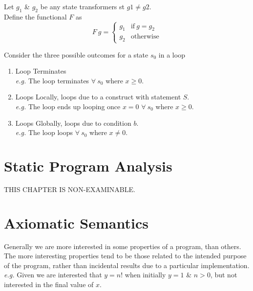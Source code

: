 \documentclass[11pt,a4paper]{article}
\begin{document}
Let $g_1$ \& $g_2$ be any state transformers st $g1\neq g2$.\\
Define the functional $F$ as
$$F\ g=\begin{cases}g_1&\mathrm{if\ }g=g_2\\g_2&\mathrm{otherwise}\end{cases}$$

Consider the three possible outcomes for a state $s_0$ in a loop
\begin{enumerate}[label=\roman*)]
	\item Loop Terminates\\
	\textit{e.g.} The loop {} terminates $\forall\ s_0$ where $x\geq0$.
	\item Loops Locally, loops due to a construct with statement $S$.\\
	\textit{e.g.} The loop {} ends up looping once $x=0$ $\forall\ s_0$ where $x\geq0$.
	\item Loops Globally, loops due to condition $b$.\\
	\textit{e.g.} The loop {} loops $\forall\ s_0$ where $x\neq0$.\\
\end{enumerate}

\section{Static Program Analysis}
THIS CHAPTER IS NON-EXAMINABLE.

\section{Axiomatic Semantics}

Generally we are more interested in some properties of a program, than others.\\
The more interesting properties tend to be those related to the intended purpose of the program, rather than incidental results due to a particular implementation.\\
\textit{e.g.} Given {} we are interested that $y=n!$ when initially $y=1$ \& $n>0$, but not interested in the final value of $x$.\\
\end{document}
